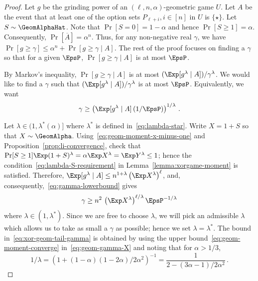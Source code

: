 \begin{proof}
    Let $g$ be the grinding power of an $(\ell, n, \alpha)$-geometric game $U$.
    Let $A$ be the event that 
    at least one of the option sets $P_{\ell + i}, i \in [n]$ in $U$ is $\{\star\}$. 
    Let $S \sim \GeomAlphaHat$. 
    Note that $\Pr[S = 0] = 1 - \alpha$ and hence $\Pr[S \geq 1] = \alpha$. 
    Consequently, $\Pr[\overline{A}] = \alpha^n$. 
    Thus, for any non-negative real $\gamma$, 
    we have $\Pr[g \geq \gamma] \leq \alpha^n + \Pr[g \geq \gamma \mid A]$. 
    The rest of the proof focuses on finding a $\gamma$ so that 
    for a given $\EpsP$, 
    $\Pr[g \geq \gamma \mid A]$ is at most $\EpsP$.

    By Markov's inequality, 
    $\Pr[g \geq \gamma \mid A]$ is at most $(\Exp [g^\lambda \mid A])/\gamma^\lambda$.
    We would like to find a $\gamma$ such that 
    $(\Exp [g^\lambda \mid A])/\gamma^\lambda$ is at most $\EpsP$. 
    Equivalently, we want 
    \begin{equation}\label{eq:gamma-lowerbound}
        \gamma \geq 
        \left( \Exp[g^\lambda \mid A]\,(1/\EpsP) \right)^{1/\lambda}
        \,.         
    \end{equation}

    Let $\lambda \in (1, \lambda^*(\alpha)]$ 
    where $\lambda^*$ is defined in~\eqref{eq:lambda-star}. 
    Write $X = 1 + S$ 
    so that $X \sim \GeomAlpha$. 
    Using~\eqref{eq:geom-moment-x-minus-one} and Proposition~\ref{prop:li-convergence}, 
    check that $\Pr[S \geq 1] \Exp (1 + S)^\lambda = \alpha \Exp X^\lambda = \Exp Y^\lambda \leq 1$; 
    hence 
    the condition~\eqref{eq:lambda-S-requirement} 
    in Lemma~\ref{lemma:xorgame-moment} is satisfied. 
    Therefore, 
    $
           \Exp[g^\lambda \mid A] \leq 
            n^{1+\lambda} 
            \left(\Exp X^\lambda\right)^{\ell}
    $,
    and, consequently,~\eqref{eq:gamma-lowerbound} gives 
    \begin{equation}\label{eq:geom-gamma-X}
        \gamma 
        \geq n^2 \,
            \left(\Exp X^\lambda\right)^{\ell/\lambda} \EpsP^{-1/\lambda}
    \end{equation}  
    where $\lambda \in (1, \lambda^*)$. 
    Since we are free to choose $\lambda$, 
    we will pick an admissible $\lambda$ which 
    allows us to take as small a $\gamma$ as possible; 
    hence we set $\lambda = \lambda^*$. 
    The bound in~\eqref{eq:xor-geom-tail-gamma} is obtained by 
    using the upper bound~\eqref{eq:geom-moment-converge} in~\eqref{eq:geom-gamma-X}
    and noting that for $\alpha > 1/3$, 
    $$
        1/\lambda = (1 + (1- \alpha)(1 - 2 \alpha)/2 \alpha^2)^{-1} 
        = \frac{1}{2 - (3\alpha - 1)/2\alpha^2}
        \,.
    $$   
\end{proof}


